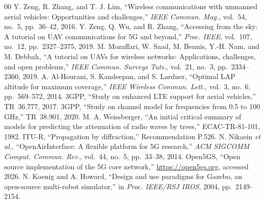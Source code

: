 \documentclass[10pt, conference]{IEEEtran}
\begin{document}
\begin{thebibliography}{00}
 Y. Zeng, R. Zhang, and T. J. Lim, ``Wireless
communications with unmanned aerial vehicles: Opportunities and challenges,''
\textit{IEEE Commun. Mag.}, vol.~54, no.~5, pp.~36--42, 2016.
 Y. Zeng, Q. Wu, and R. Zhang, ``Accessing from the
sky: A tutorial on UAV communications for 5G and beyond,'' \textit{Proc. IEEE},
vol.~107, no.~12, pp.~2327--2375, 2019.
 M. Mozaffari, W. Saad, M. Bennis, Y.-H. Nam, and
M. Debbah, ``A tutorial on UAVs for wireless networks: Applications, challenges,
and open problems,'' \textit{IEEE Commun. Surveys Tuts.}, vol.~21, no.~3,
pp.~2334--2360, 2019.
 A. Al-Hourani, S. Kandeepan, and S. Lardner,
``Optimal LAP altitude for maximum coverage,'' \textit{IEEE Wireless Commun.
Lett.}, vol.~3, no.~6, pp.~569--572, 2014.
 3GPP, ``Study on enhanced LTE support for aerial vehicles,''
TR~36.777, 2017.
 3GPP, ``Study on channel model for frequencies from 0.5 to
100 GHz,'' TR~38.901, 2020.
 M. A. Weissberger, ``An initial critical summary of
models for predicting the attenuation of radio waves by trees,'' ECAC-TR-81-101,
1982.
 ITU-R, ``Propagation by diffraction,'' Recommendation P.526.
 N. Nikaein \textit{et al.}, ``OpenAirInterface: A flexible
platform for 5G research,'' \textit{ACM SIGCOMM Comput. Commun. Rev.}, vol.~44,
no.~5, pp.~33--38, 2014.
 Open5GS, ``Open source implementation of the 5G core network,''
\url{https://open5gs.org}, accessed 2026.
 N. Koenig and A. Howard, ``Design and use paradigms for
Gazebo, an open-source multi-robot simulator,'' in \textit{Proc. IEEE/RSJ IROS},
2004, pp.~2149--2154.
\end{thebibliography}
\end{document}
